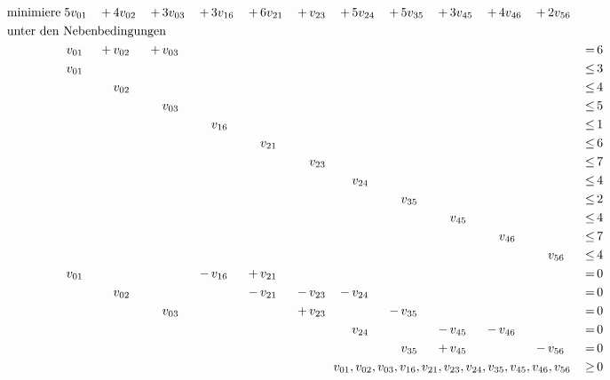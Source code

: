\documentclass[10pt,a4paper,oneside,ngerman,numbers=noenddot]{scrartcl}
\begin{document}
	\subsection{} %
		\begin{alignat*}{12}
			\text{minimiere}\; & 5v_{01} \,&+&\, 4v_{02} \,&+&\, 3v_{03} \,&+&\, 3v_{16} \,&+&\, 6v_{21} \,&+&\, v_{23} \,&+&\, 5v_{24} \,&+&\, 5v_{35} \,&+&\, 3v_{45} \,&+&\, 4v_{46} \,&+&\, 2v_{56} \,&& \\
			\multicolumn{24}{l}{\text{unter den Nebenbedingungen}} && \\
			\;&\, v_{01} \,&+&\, v_{02} \,&+&\, v_{03} \,&& && && && && && && && \,&=&\, 6 \\
			\;&\, v_{01} \,&& && && && && && && && && && \,&\leq &\, 3 \\
			\;& &&\, v_{02} \,&& && && && && && && && && \,&\leq &\, 4 \\
			\;& && &&\, v_{03} \,&& && && && && && && && \,&\leq &\, 5 \\
			\;& && && &&\, v_{16} \,&& && && && && && && \,&\leq &\, 1 \\
			\;& && && && &&\, v_{21} \,&& && && && && && \,&\leq &\, 6 \\
			\;& && && && && &&\, v_{23} \,&& && && && && \,&\leq &\, 7 \\
			\;& && && && && && &&\, v_{24} \,&& && && && \,&\leq &\, 4 \\
			\;& && && && && && && &&\, v_{35} \,&& && && \,&\leq &\, 2 \\
			\;& && && && && && && && &&\, v_{45} \,&& && \,&\leq &\, 4 \\
			\;& && && && && && && && && &&\, v_{46} \,&& \,&\leq &\, 7 \\
			\;& && && && && && && && && && &&\, v_{56} \,&\leq &\, 4 \\
			\;&\, v_{01} && && &-&\, v_{16} \,&+&\, v_{21} \,&& && && && && && \,&=&\, 0 \\
			\;& &&\, v_{02} \,&& && &-&\, v_{21} \,&-&\, v_{23} \,&-&\, v_{24} \,&& && && && \,&=&\, 0 \\
			\;& && &&\, v_{03} \,&& && &+&\, v_{23} \,&& &-&\, v_{35} \,&& && && \,&=&\, 0 \\
			\;& && && && && && &&\, v_{24} \,&& &-&\, v_{45} \,&-&\, v_{46} \,&& \,&=&\, 0 \\
			\;& && && && && && && &&\, v_{35} \,&+&\, v_{45} \,&& &-&\, v_{56} \,&=&\, 0 \\
			\multicolumn{22}{r}{$v_{01}, v_{02}, v_{03}, v_{16}, v_{21}, v_{23}, v_{24}, v_{35}, v_{45}, v_{46}, v_{56}$} \,&\geq &\, 0
		\end{alignat*}
\end{document}

